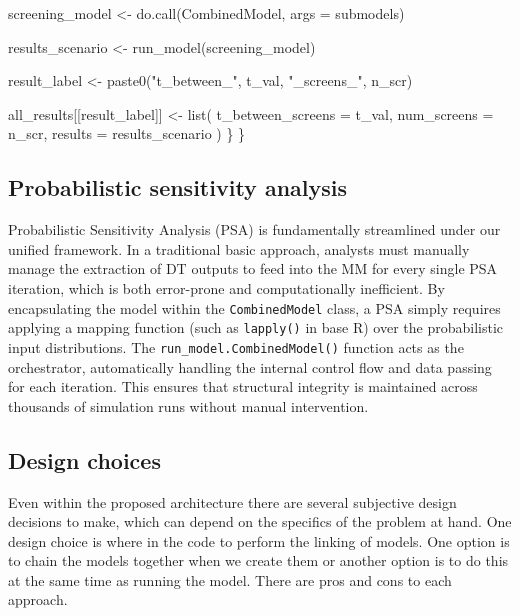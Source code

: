 \documentclass[
]{article}
\newenvironment{Shaded}{\begin{snugshade}}{\end{snugshade}}
\newcommand{\AttributeTok}[1]{\textcolor[rgb]{0.40,0.45,0.13}{#1}}
\newcommand{\FunctionTok}[1]{\textcolor[rgb]{0.28,0.35,0.67}{#1}}
\newcommand{\NormalTok}[1]{\textcolor[rgb]{0.00,0.23,0.31}{#1}}
\newcommand{\OtherTok}[1]{\textcolor[rgb]{0.00,0.23,0.31}{#1}}
\newcommand{\StringTok}[1]{\textcolor[rgb]{0.13,0.47,0.30}{#1}}
\begin{document}
\begin{Shaded}
\begin{Highlighting}[]
\NormalTok{    screening\_model }\OtherTok{\textless{}{-}} \FunctionTok{do.call}\NormalTok{(CombinedModel, }\AttributeTok{args =}\NormalTok{ submodels)}
    
\NormalTok{    results\_scenario }\OtherTok{\textless{}{-}} \FunctionTok{run\_model}\NormalTok{(screening\_model)}
    
\NormalTok{    result\_label }\OtherTok{\textless{}{-}} \FunctionTok{paste0}\NormalTok{(}\StringTok{"t\_between\_"}\NormalTok{, t\_val, }\StringTok{"\_screens\_"}\NormalTok{, n\_scr)}
    
\NormalTok{    all\_results[[result\_label]] }\OtherTok{\textless{}{-}} \FunctionTok{list}\NormalTok{(}
      \AttributeTok{t\_between\_screens =}\NormalTok{ t\_val,}
      \AttributeTok{num\_screens       =}\NormalTok{ n\_scr,}
      \AttributeTok{results           =}\NormalTok{ results\_scenario}
\NormalTok{    )}
\NormalTok{  \}}
\NormalTok{\}}
\end{Highlighting}
\end{Shaded}

\subsection{Probabilistic sensitivity
analysis}\label{probabilistic-sensitivity-analysis}

Probabilistic Sensitivity Analysis (PSA) is fundamentally streamlined
under our unified framework. In a traditional basic approach, analysts
must manually manage the extraction of DT outputs to feed into the MM
for every single PSA iteration, which is both error-prone and
computationally inefficient. By encapsulating the model within the
\texttt{CombinedModel} class, a PSA simply requires applying a mapping
function (such as \texttt{lapply()} in base R) over the probabilistic
input distributions. The \texttt{run\_model.CombinedModel()} function
acts as the orchestrator, automatically handling the internal control
flow and data passing for each iteration. This ensures that structural
integrity is maintained across thousands of simulation runs without
manual intervention.

\subsection{Design choices}\label{design-choices}

Even within the proposed architecture there are several subjective
design decisions to make, which can depend on the specifics of the
problem at hand. One design choice is where in the code to perform the
linking of models. One option is to chain the models together when we
create them or another option is to do this at the same time as running
the model. There are pros and cons to each approach.
\end{document}
